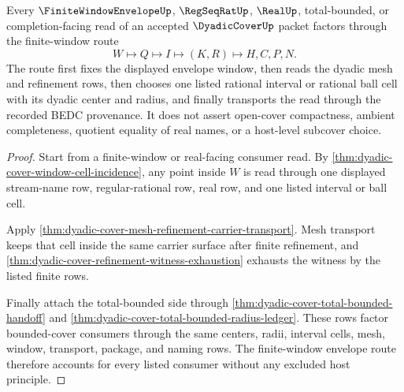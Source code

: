 \begin{theorem}
\label{thm:dyadic-cover-finite-window-envelope-factorization}
Every $\FiniteWindowEnvelopeUp$, $\RegSeqRatUp$, $\RealUp$, total-bounded, or
completion-facing read of an accepted $\DyadicCoverUp$ packet factors through
the finite-window route
$$
W \longmapsto Q \longmapsto I \longmapsto (K,R) \longmapsto H,C,P,N.
$$
The route first fixes the displayed envelope window, then reads the dyadic mesh
and refinement rows, then chooses one listed rational interval or rational ball
cell with its dyadic center and radius, and finally transports the read through
the recorded BEDC provenance. It does not assert open-cover compactness,
ambient completeness, quotient equality of real names, or a host-level
subcover choice.
\end{theorem}
\begin{proof}
Start from a finite-window or real-facing consumer read. By
\autoref{thm:dyadic-cover-window-cell-incidence}, any point inside $W$ is read
through one displayed stream-name row, regular-rational row, real row, and one
listed interval or ball cell.

Apply \autoref{thm:dyadic-cover-mesh-refinement-carrier-transport}. Mesh
transport keeps that cell inside the same carrier surface after finite
refinement, and \autoref{thm:dyadic-cover-refinement-witness-exhaustion}
exhausts the witness by the listed finite rows.

Finally attach the total-bounded side through
\autoref{thm:dyadic-cover-total-bounded-handoff} and
\autoref{thm:dyadic-cover-total-bounded-radius-ledger}. These rows factor
bounded-cover consumers through the same centers, radii, interval cells, mesh,
window, transport, package, and naming rows. The finite-window envelope route
therefore accounts for every listed consumer without any excluded host
principle.
\end{proof}

